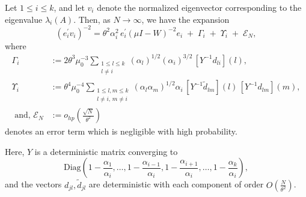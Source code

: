 \documentclass[10pt,a4paper]{amsart}
\begin{document}
\begin{lemma}\label{EVec.pivot1}
Let \(1 \leq i \leq k\), and let \(v_i\) denote the normalized eigenvector corresponding to the eigenvalue \(\lambda_i(A)\). Then, as \(N \to \infty\), we have the expansion
\begin{equation}\label{finding}
(e_i^\prime v_i)^{-2} 
= \theta^2\alpha_i^2\, e_i^\prime (\mu I - W)^{-2}e_i \;+\; \Gamma_i \;+\; \Upsilon_i \;+\; \mathcal{E}_N,
\end{equation}
where
\begin{align*}
\Gamma_i &:= 2\theta^3 \mu_0^{-3} \sum_{\substack{1 \le l \le k \\ l \ne i}} (\alpha_l)^{1/2}(\alpha_i)^{3/2}\, \left[Y^{-1} d_{li}\right](l), \\
\Upsilon_i &:= \theta^4 \mu_0^{-4} \sum_{\substack{1 \le l,m \le k \\ l \ne i,\, m \ne i}} (\alpha_l \alpha_m)^{1/2} \alpha_i\, \left[Y^{-1} \tilde d_{lm}\right](l)\, \left[Y^{-1} d_{lm}\right](m), \\
\text{ and, } 
\mathcal{E}_N &:= o_{hp}\left(\frac{\sqrt{N}}{\theta^2}\right)
\end{align*}
denotes an error term which is negligible with high probability.

Here, \(Y\) is a deterministic matrix converging to 
\[
\mathrm{Diag}\left(1-\frac{\alpha_1}{\alpha_i},\ldots,1-\frac{\alpha_{i-1}}{\alpha_i},1-\frac{\alpha_{i+1}}{\alpha_i},\ldots,1-\frac{\alpha_k}{\alpha_i}\right),
\]
and the vectors \(d_{jl}, \tilde d_{jl}\) are deterministic with each component of order \(O\left(\frac{N}{\theta^2}\right)\).
\end{lemma}
\end{document}
